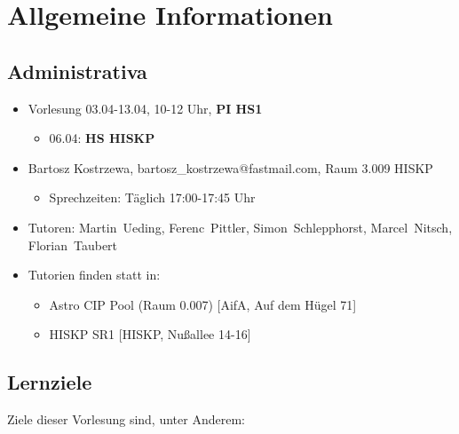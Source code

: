 \setcounter{minutecounter}{0}

\section*{Allgemeine Informationen}

\subsection{Administrativa}

\iflecturer
\begin{framed}

  \slide{}
\end{framed}
\fi %

\begin{itemize}
 \item{Vorlesung 03.04-13.04, 10-12 Uhr, \textbf{PI HS1}}
 \begin{itemize}
   \item{06.04: \textbf{HS HISKP} }
 \end{itemize}
 \item{Bartosz Kostrzewa, bartosz\_kostrzewa@fastmail.com, Raum 3.009 HISKP}
 \begin{itemize}
   \item{Sprechzeiten: Täglich 17:00-17:45 Uhr}
 \end{itemize}
 \item{Tutoren: Martin~Ueding, Ferenc~Pittler, Simon~Schlepphorst, Marcel~Nitsch, Florian~Taubert}
 \item{Tutorien finden statt in:}
 \begin{itemize}
   \item{Astro CIP Pool (Raum 0.007) [AifA, Auf dem Hügel 71]}
   \item{HISKP SR1 [HISKP, Nußallee 14-16]}
 \end{itemize}
\end{itemize}

\subsection{Lernziele}

\iflecturer
\begin{framed}

  \slide{}
\end{framed}
\fi %

Ziele dieser Vorlesung sind, unter Anderem:


